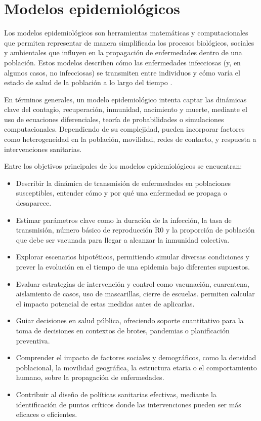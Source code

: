\section{Modelos epidemiológicos}

Los modelos epidemiológicos son herramientas matemáticas y computacionales que permiten representar de manera simplificada los procesos biológicos, sociales y ambientales que influyen en la propagación de enfermedades dentro de una población. Estos modelos describen cómo las enfermedades infecciosas (y, en algunos casos, no infecciosas) se transmiten entre individuos y cómo varía el estado de salud de la población a lo largo del tiempo \cite{ferrero2021modelos}.

En términos generales, un modelo epidemiológico intenta captar las dinámicas clave del contagio, recuperación, inmunidad, nacimiento y muerte, mediante el uso de ecuaciones diferenciales, teoría de probabilidades o simulaciones computacionales. Dependiendo de su complejidad, pueden incorporar factores como heterogeneidad en la población, movilidad, redes de contacto, y respuesta a intervenciones sanitarias.

Entre los objetivos principales de los modelos epidemiológicos se encuentran:
\begin{itemize}
    \item Describir la dinámica de transmisión de enfermedades en poblaciones susceptibles, entender cómo y por qué una enfermedad se propaga o desaparece.
    \item Estimar parámetros clave como la duración de la infección, la tasa de transmisión, número básico de reproducción R0 y la proporción de población que debe ser vacunada para llegar a alcanzar la inmunidad colectiva.
    \item Explorar escenarios hipotéticos, permitiendo simular diversas condiciones y prever la evolución en el tiempo de una epidemia bajo diferentes supuestos.
    \item Evaluar estrategias de intervención y control como vacunación, cuarentena, aislamiento de casos, uso de mascarillas, cierre de escuelas. permiten calcular el impacto potencial de estas medidas antes de aplicarlas.
    \item Guiar decisiones en salud pública, ofreciendo soporte cuantitativo para la toma de decisiones en contextos de brotes, pandemias o planificación preventiva.
    \item Comprender el impacto de factores sociales y demográficos, como la densidad poblacional, la movilidad geográfica, la estructura etaria o el comportamiento humano, sobre la propagación de enfermedades.
    \item Contribuir al diseño de políticas sanitarias efectivas, mediante la identificación de puntos críticos donde las intervenciones pueden ser más eficaces o eficientes.
\end{itemize}

